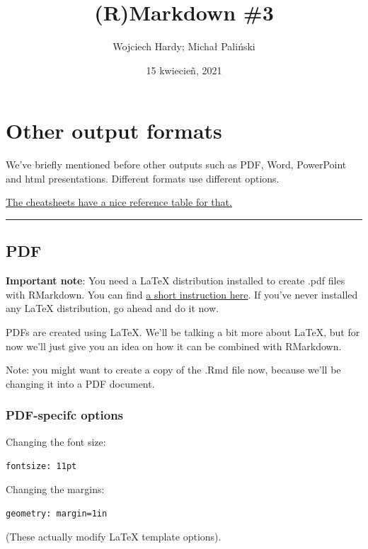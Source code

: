 \documentclass[
  11pt,
]{article}
\title{(R)Markdown \#3}
\author{Wojciech Hardy; Michał Paliński}
\date{15 kwiecieñ, 2021}
\begin{document}
\maketitle

{
\setcounter{tocdepth}{3}
\tableofcontents
}
\hypertarget{other-output-formats}{%
\section{Other output formats}\label{other-output-formats}}

We've briefly mentioned before other outputs such as PDF, Word,
PowerPoint and html presentations. Different formats use different
options.

\href{https://www.rstudio.com/wp-content/uploads/2015/03/rmarkdown-reference.pdf}{The
cheatsheets have a nice reference table for that.}

\begin{center}\rule{0.5\linewidth}{0.5pt}\end{center}

\hypertarget{pdf}{%
\subsection{PDF}\label{pdf}}

\textbf{Important note}: You need a LaTeX distribution installed to
create .pdf files with RMarkdown. You can find
\href{https://bookdown.org/yihui/rmarkdown-cookbook/install-latex.html}{a
short instruction here}. If you've never installed any LaTeX
distribution, go ahead and do it now.

PDFs are created using LaTeX. We'll be talking a bit more about LaTeX,
but for now we'll just give you an idea on how it can be combined with
RMarkdown.

Note: you might want to create a copy of the .Rmd file now, because
we'll be changing it into a PDF document.

\hypertarget{pdf-specifc-options}{%
\subsubsection{PDF-specifc options}\label{pdf-specifc-options}}

Changing the font size:

\texttt{fontsize:\ 11pt}

Changing the margins:

\texttt{geometry:\ margin=1in}

(These actually modify LaTeX template options).
\end{document}

